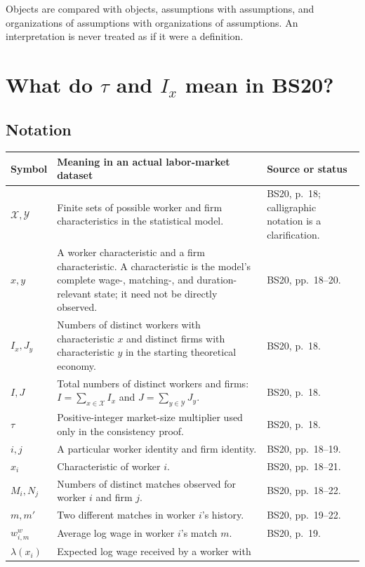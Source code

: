 \documentclass[11pt]{article}
\begin{document}
Objects are compared with objects, assumptions with assumptions, and
organizations of assumptions with organizations of assumptions.  An
interpretation is never treated as if it were a definition.

\section{What do \(\tau\) and \(I_x\) mean in BS20?}

\subsection{Notation}

\begin{longtable}{p{}p{}p{}}
\textbf{Symbol} & \textbf{Meaning in an actual labor-market dataset} &
\textbf{Source or status} \\
\hline
\(\mathcal X,\mathcal Y\) & Finite sets of possible worker and firm
characteristics in the statistical model. & BS20, p.\ 18; calligraphic
notation is a clarification. \\
\(x,y\) & A worker characteristic and a firm characteristic.  A
characteristic is the model's complete wage-, matching-, and
duration-relevant state; it need not be directly observed. & BS20,
pp.\ 18--20. \\
\(I_x,J_y\) & Numbers of distinct workers with characteristic \(x\) and
distinct firms with characteristic \(y\) in the starting theoretical
economy. & BS20, p.\ 18. \\
\(I,J\) & Total numbers of distinct workers and firms:
\(I=\sum_{x\in\mathcal X}I_x\) and
\(J=\sum_{y\in\mathcal Y}J_y\). & BS20, p.\ 18. \\
\(\tau\) & Positive-integer market-size multiplier used only in the
consistency proof. & BS20, p.\ 18. \\
\(i,j\) & A particular worker identity and firm identity. & BS20,
pp.\ 18--19. \\
\(x_i\) & Characteristic of worker \(i\). & BS20, pp.\ 18--21. \\
\(M_i,N_j\) & Numbers of distinct matches observed for worker \(i\) and firm
\(j\). & BS20, pp.\ 18--22. \\
\(m,m'\) & Two different matches in worker \(i\)'s history. & BS20,
pp.\ 19--22. \\
\(w^w_{i,m}\) & Average log wage in worker \(i\)'s match \(m\). & BS20,
p.\ 19. \\
\(\lambda(x_i)\) & Expected log wage received by a worker with

\end{longtable}
\end{document}
